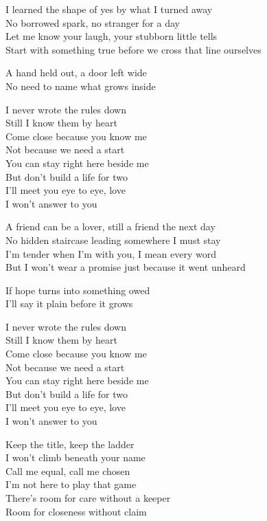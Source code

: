 \begin{lyrics}
I learned the shape of yes by what I turned away\\
No borrowed spark, no stranger for a day\\
Let me know your laugh, your stubborn little tells\\
Start with something true before we cross that line ourselves

A hand held out, a door left wide\\
No need to name what grows inside

I never wrote the rules down\\
Still I know them by heart\\
Come close because you know me\\
Not because we need a start\\
You can stay right here beside me\\
But don’t build a life for two\\
I’ll meet you eye to eye, love\\
I won’t answer to you

A friend can be a lover, still a friend the next day\\
No hidden staircase leading somewhere I must stay\\
I’m tender when I’m with you, I mean every word\\
But I won’t wear a promise just because it went unheard

If hope turns into something owed\\
I’ll say it plain before it grows

I never wrote the rules down\\
Still I know them by heart\\
Come close because you know me\\
Not because we need a start\\
You can stay right here beside me\\
But don’t build a life for two\\
I’ll meet you eye to eye, love\\
I won’t answer to you

Keep the title, keep the ladder\\
I won’t climb beneath your name\\
Call me equal, call me chosen\\
I’m not here to play that game\\
There’s room for care without a keeper\\
Room for closeness without claim


\end{lyrics}
